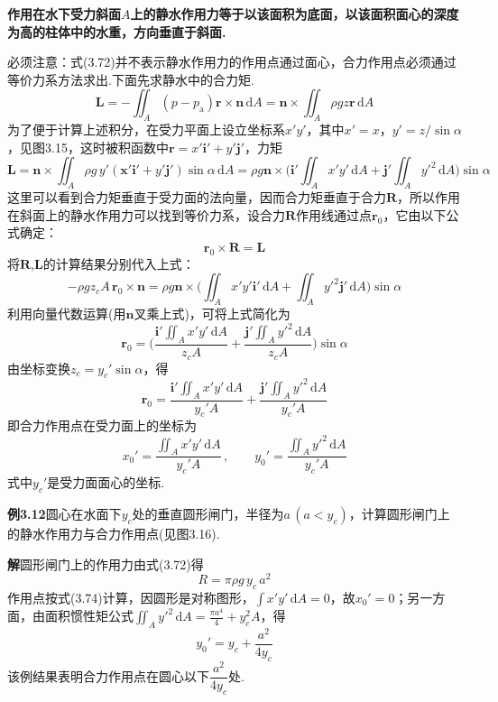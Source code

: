 \textbf{作用在水下受力斜面$A$上的静水作用力等于以该面积为底面，以该面积面心的深度为高的柱体中的水重，方向垂直于斜面.}

必须注意：式(3.72)并不表示静水作用力的作用点通过面心，合力作用点必须通过等价力系方法求出.下面先求静水中的合力矩.
\[
\boldsymbol{L}=-\iint_A(p-p_{\mathrm{a}})\boldsymbol{r}\times\boldsymbol{n}\,\mathrm{d}A=\boldsymbol{n}\times\iint_A \rho gz\boldsymbol{r}\,\mathrm{d}A
\]
为了便于计算上述积分，在受力平面上设立坐标系$x'y'$，其中$x'=x$，$y'=z/\sin\alpha$，见图3.15，这时被积函数中$\boldsymbol{r}=x'\boldsymbol{i}'+y'\boldsymbol{j}'$，力矩
\[
\boldsymbol{L}=\boldsymbol{n}\times\iint_A \rho g\,y'(\boldsymbol{x}'\boldsymbol{i}'+y'\boldsymbol{j}')\sin\alpha\,\mathrm{d}A=\rho g\boldsymbol{n}\times\Big(\boldsymbol{i}'\iint_A x'y'\,\mathrm{d}A+\boldsymbol{j}'\iint_A y'^{2}\,\mathrm{d}A\Big)\sin\alpha
\]
这里可以看到合力矩垂直于受力面的法向量，因而合力矩垂直于合力$\boldsymbol{R}$，所以作用在斜面上的静水作用力可以找到等价力系，设合力$\boldsymbol{R}$作用线通过点$\boldsymbol{r}_0$，它由以下公式确定：
\[
\boldsymbol{r}_0\times\boldsymbol{R}=\boldsymbol{L}
\]
将$\boldsymbol{R}$,$\boldsymbol{L}$的计算结果分别代入上式：
\[
-\rho g z_c A\,\boldsymbol{r}_0\times\boldsymbol{n}=\rho g\boldsymbol{n}\times\bigg(\iint_A x'y'\boldsymbol{i}'\,\mathrm{d}A+\iint_A y'^{2}\boldsymbol{j}'\,\mathrm{d}A\bigg)\sin\alpha
\]
利用向量代数运算(用$\boldsymbol{n}$叉乘上式)，可将上式简化为
\[
\boldsymbol{r}_0=\bigg(\frac{\boldsymbol{i}'\iint_A x'y'\,\mathrm{d}A}{z_c A}+\frac{\boldsymbol{j}'\iint_A y'^{2}\,\mathrm{d}A}{z_c A}\bigg)\sin\alpha
\]
由坐标变换$z_c=y_c'\sin\alpha$，得
\begin{equation*}
\boldsymbol{r}_0=\frac{\boldsymbol{i}'\iint_A x'y'\,\mathrm{d}A}{y_c'A}+\frac{\boldsymbol{j}'\iint_A y'^{2}\,\mathrm{d}A}{y_c'A}
\tag{3.73}
\end{equation*}
即合力作用点在受力面上的坐标为
\begin{equation*}
x_0'=\frac{\displaystyle\iint_A x'y'\,\mathrm{d}A}{y_c'A}\,,\qquad y_0'=\frac{\displaystyle\iint_A y'^{2}\,\mathrm{d}A}{y_c'A}
\tag{3.74}
\end{equation*}
式中$y_c'$是受力面面心的坐标.

\noindent\textbf{例3.12}\quad 圆心在水面下$y_c$处的垂直圆形闸门，半径为$a\,(a<y_c)$，计算圆形闸门上的静水作用力与合力作用点(见图3.16).

\noindent\textbf{解}\quad 圆形闸门上的作用力由式(3.72)得
\[
R=\pi\rho g\,y_c\,a^{2}
\]
作用点按式(3.74)计算，因圆形是对称图形，$\displaystyle\int x'y'\,\mathrm{d}A=0$，故$x_0'=0$；另一方面，由面积惯性矩公式$\displaystyle\iint_A y'^{2}\,\mathrm{d}A=\frac{\pi a^{4}}{4}+y_c^{2}A$，得
\[
y_0'=y_c+\frac{a^{2}}{4y_c}
\]
该例结果表明合力作用点在圆心以下$\dfrac{a^{2}}{4y_c}$处.

